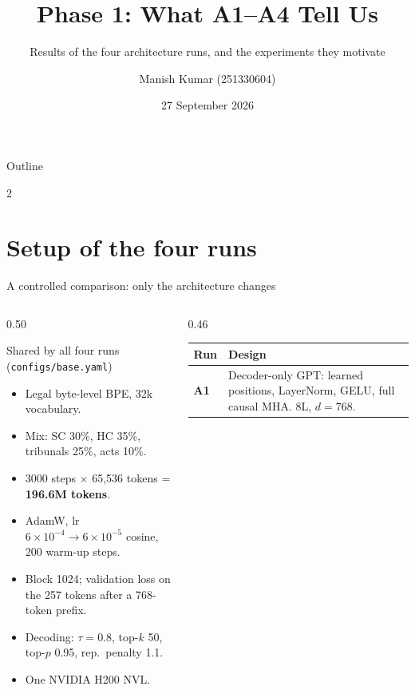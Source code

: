 \documentclass[aspectratio=169,11pt]{beamer}
\title[CS-781 Phase 1: results and next steps]{Phase 1: What A1--A4 Tell Us}
\subtitle{Results of the four architecture runs, and the experiments they motivate}
\author[Manish Kumar]{Manish Kumar (251330604)}
\institute{CS-781, IIT Kanpur}
\date{27 September 2026}
\newcommand{\code}[1]{\texttt{\small #1}}
\begin{document}
\begin{frame}
  \titlepage
\end{frame}

\begin{frame}{Outline}
  \begin{multicols}{2}
  \tableofcontents
  \end{multicols}
\end{frame}

\section{Setup of the four runs}

\begin{frame}{A controlled comparison: only the architecture changes}
  \begin{columns}[T]
    \begin{column}{0.50\textwidth}
      \footnotesize
      \begin{block}{Shared by all four runs (\code{configs/base.yaml})}
        \begin{itemize}
          \item Legal byte-level BPE, 32k vocabulary.
          \item Mix: SC 30\%, HC 35\%, tribunals 25\%, acts 10\%.
          \item 3000 steps $\times$ 65{,}536 tokens = \textbf{196.6M tokens}.
          \item AdamW, lr $6\!\times\!10^{-4}\to6\!\times\!10^{-5}$ cosine, 200 warm-up steps.
          \item Block 1024; validation loss on the 257 tokens after a 768-token prefix.
          \item Decoding: $\tau{=}0.8$, top-$k$ 50, top-$p$ 0.95, rep.\ penalty 1.1.
          \item One NVIDIA H200 NVL.
        \end{itemize}
      \end{block}
    \end{column}
    \begin{column}{0.46\textwidth}
      \small
      \begin{tabularx}{\textwidth}{@{}lX@{}}
        \toprule
        Run & Design\\
        \midrule
        \textcolor{cA1}{\textbf{A1}} & Decoder-only GPT: learned positions, LayerNorm, GELU, full causal MHA. 8L, $d{=}768$.\\

\end{tabularx}
\end{column}
\end{columns}
\end{frame}
\end{document}
